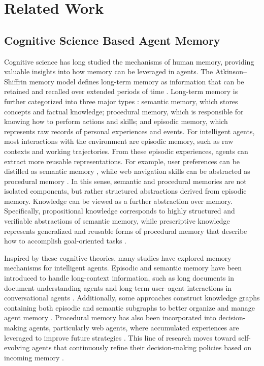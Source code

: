 \section{Related Work}
\label{app:related_work}
\subsection{Cognitive Science Based Agent Memory}
Cognitive science has long studied the mechanisms of human memory, providing valuable insights into how memory can be leveraged in agents. The Atkinson–Shiffrin memory model defines long-term memory as information that can be retained and recalled over extended periods of time \citep{Atkinson1968HumanMemory}. Long-term memory is further categorized into three major types \citep{Tulving1972EpisodicSemantic, Squire2004MemorySystems}: semantic memory, which stores concepts and factual knowledge; procedural memory, which is responsible for knowing how to perform actions and skills; and episodic memory, which represents raw records of personal experiences and events. For intelligent agents, most interactions with the environment are episodic memory, such as raw contexts and working trajectories. From these episodic experiences, agents can extract more reusable representations. For example, user preferences can be distilled as semantic memory \citep{li2025memosmemoryosai}, while web navigation skills can be abstracted as procedural memory \citep{wang2024agentworkflowmemory}. In this sense, semantic and procedural memories are not isolated components, but rather structured abstractions derived from episodic memory. Knowledge can be viewed as a further abstraction over memory. Specifically, propositional knowledge corresponds to highly structured and verifiable abstractions of semantic memory, while prescriptive knowledge represents generalized and reusable forms of procedural memory that describe how to accomplish goal-oriented tasks \citep{10.1257/aer.103.3.545}. \par
Inspired by these cognitive theories, many studies have explored memory mechanisms for intelligent agents. Episodic and semantic memory have been introduced to handle long-context information, such as long documents in document understanding agents \citep{lee2024humaninspiredreadingagentgist} and long-term user–agent interactions in conversational agents \citep{li2025memosmemoryosai}. Additionally, some approaches construct knowledge graphs containing both episodic and semantic subgraphs to better organize and manage agent memory \citep{anokhin2024arigraphlearningknowledgegraph,rasmussen2025zeptemporalknowledgegraph}. Procedural memory has also been incorporated into decision-making agents, particularly web agents, where accumulated experiences are leveraged to improve future strategies \citep{zhao2024expelllmagentsexperiential}. This line of research moves toward self-evolving agents that continuously refine their decision-making policies based on incoming memory \citep{wang2024agentworkflowmemory, DBLP:journals/corr/abs-2508-06433, ouyang2025reasoningbankscalingagentselfevolving}. \par
